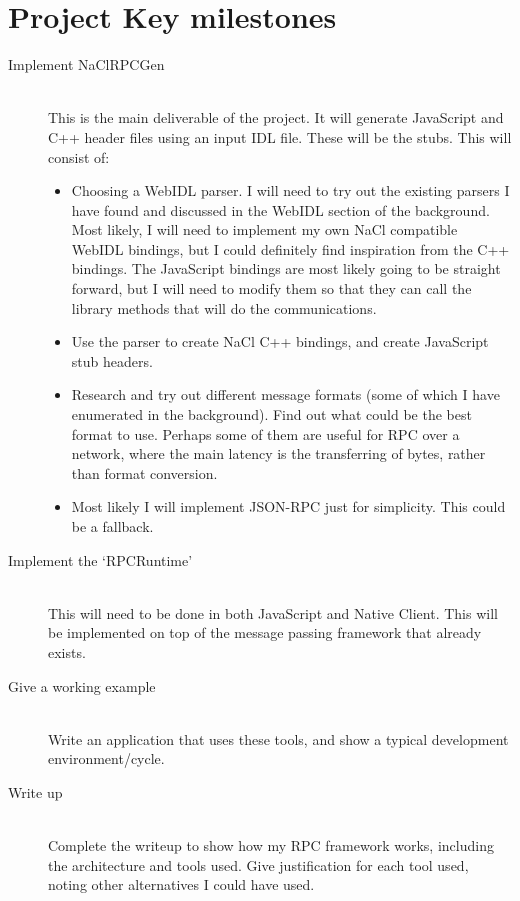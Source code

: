\section{Project Key milestones}
\begin{description}
	\item[Implement NaClRPCGen] 
	~\\
	This is the main deliverable of the project. It will generate JavaScript and C++ header files using an input IDL file. These will be the stubs. This will consist of:
	\begin{itemize}
		\item Choosing a WebIDL parser. I will need to try out the existing parsers I have found and discussed in the WebIDL section of the background. Most likely, I will need to implement my own NaCl compatible WebIDL bindings, but I could definitely find inspiration from the C++ bindings. The JavaScript bindings are most likely going to be straight forward, but I will need to modify them so that they can call the library methods that will do the communications.
		\item Use the parser to create NaCl C++ bindings, and create JavaScript stub headers.
		\item Research and try out different message formats (some of which I have enumerated in the background). Find out what could be the best format to use. Perhaps some of them are useful for RPC over a network, where the main latency is the transferring of bytes, rather than format conversion.
		\item Most likely I will implement JSON-RPC just for simplicity. This could be a fallback.
	\end{itemize}
	\item[Implement the `RPCRuntime'] 
	~\\
	This will need to be done in both JavaScript and Native Client. This will be implemented on top of the message passing framework that already exists.
	\item[Give a working example]
	~\\
	Write an application that uses these tools, and show a typical development environment/cycle.
	\item[Write up] 
	~\\
	Complete the writeup to show how my RPC framework works, including the architecture and tools used. Give justification for each tool used, noting other alternatives I could have used.
\end{description}

